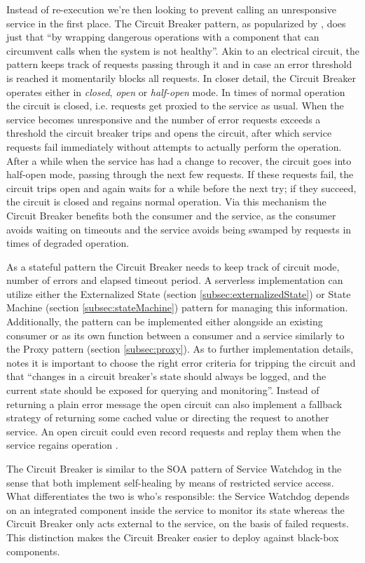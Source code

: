 Instead of re-execution we're then looking to prevent calling an unresponsive service in the first place. The Circuit Breaker pattern, as popularized by \textcite{nygard07releaseIt}, does just that ``by wrapping dangerous operations with a component that can circumvent calls when the system is not healthy''. Akin to an electrical circuit, the pattern keeps track of requests passing through it and in case an error threshold is reached it momentarily blocks all requests. In closer detail, the Circuit Breaker operates either in \textit{closed}, \textit{open} or \textit{half-open} mode. In times of normal operation the circuit is closed, i.e. requests get proxied to the service as usual. When the service becomes unresponsive and the number of error requests exceeds a threshold the circuit breaker trips and opens the circuit, after which service requests fail immediately without attempts to actually perform the operation. After a while when the service has had a change to recover, the circuit goes into half-open mode, passing through the next few requests. If these requests fail, the circuit trips open and again waits for a while before the next try; if they succeed, the circuit is closed and regains normal operation. Via this mechanism the Circuit Breaker benefits both the consumer and the service, as the consumer avoids waiting on timeouts and the service avoids being swamped by requests in times of degraded operation.

As a stateful pattern the Circuit Breaker needs to keep track of circuit mode, number of errors and elapsed timeout period. A serverless implementation can utilize either the Externalized State (section \ref{subsec:externalizedState}) or State Machine (section \ref{subsec:stateMachine}) pattern for managing this information. Additionally, the pattern can be implemented either alongside an existing consumer or as its own function between a consumer and a service similarly to the Proxy pattern (section \ref{subsec:proxy}). As to further implementation details, \textcite{nygard07releaseIt} notes it is important to choose the right error criteria for tripping the circuit and that ``changes in a circuit breaker’s state should always be logged, and the current state should be exposed for querying and monitoring''. Instead of returning a plain error message the open circuit can also implement a fallback strategy of returning some cached value or directing the request to another service. An open circuit could even record requests and replay them when the service regains operation \parencite{microsoft18cloudPatterns}.

The Circuit Breaker is similar to the SOA pattern of Service Watchdog \parencite{rotem12soa} in the sense that both implement self-healing by means of restricted service access. What differentiates the two is who's responsible: the Service Watchdog depends on an integrated component inside the service to monitor its state whereas the Circuit Breaker only acts external to the service, on the basis of failed requests. This distinction makes the Circuit Breaker easier to deploy against black-box components.
